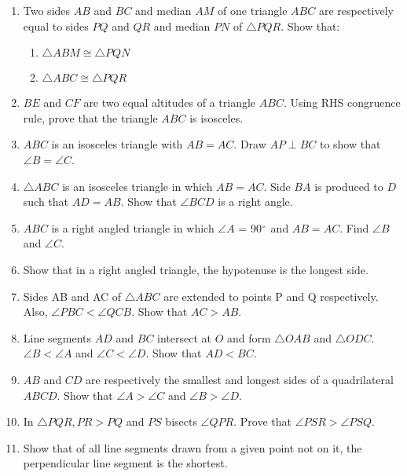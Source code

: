 \begin{enumerate}[label=\arabic*.,ref=\thesubsection.\theenumi]
\item  Two sides $AB$ and $BC$ and median $AM$ of one triangle $ABC$ are respectively equal to sides $PQ$ and $QR$ and median $PN$ of $\triangle  PQR$. Show that: 
\begin{enumerate}
\item $\triangle  ABM \cong  \triangle  PQN $
\item $\triangle  ABC \cong  \triangle  PQR$
\end{enumerate}
\item  $BE$ and $CF$ are two equal altitudes of a triangle $ABC$. Using RHS congruence rule, prove that the triangle $ABC$ is isosceles.
\item  $ABC$ is an isosceles triangle with $AB = AC$. Draw $AP \perp BC$ to show that $\angle  B = \angle  C$.
%
\item $\triangle ABC$ is an isosceles triangle in which $AB = AC$. Side $BA$ is produced to $D$ such that $AD = AB$. Show that $\angle BCD$ is a right angle.
%
\item $ABC$ is a right angled triangle in which $\angle A$ = 90$\degree$ and $AB = AC$. Find $\angle B$ and $\angle C$.
%
\item Show that in a right angled triangle, the hypotenuse is the longest side.
\item Sides AB and AC of $\triangle  ABC$ are extended to points P and Q respectively. Also, $\angle  PBC < \angle  QCB$. Show that $AC > AB$.

\item Line segments $AD$ and $BC$ intersect at $O$ and form $\triangle OAB$ and $\triangle ODC$. $\angle  B < \angle  A$ and $\angle  C < \angle  D$. Show that $AD < BC$.

\item $AB$ and $CD$ are respectively the smallest and longest sides of a quadrilateral $ABCD$. Show that $\angle  A > \angle  C$ and $\angle  B > \angle  D$.
%
\item In $\triangle PQR,  PR > PQ$ and $PS$ bisects $\angle  QPR$. Prove that $\angle  PSR > \angle  PSQ$.
%
\item Show that of all line segments drawn from a given point not on it, the perpendicular line segment is the shortest.
%


\end{enumerate}


